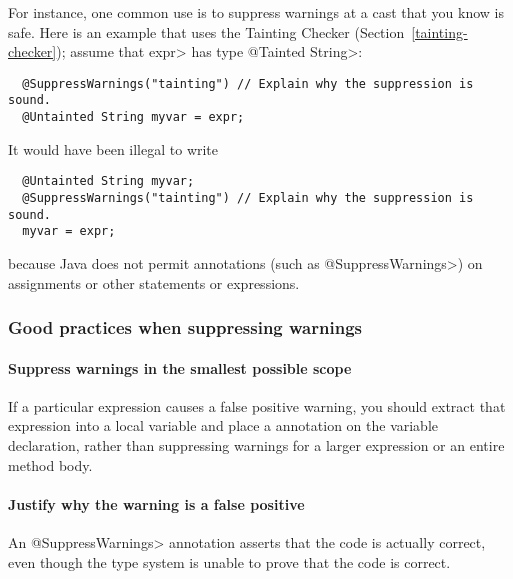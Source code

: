 For instance, one common use is
to suppress warnings at a cast that you know is safe.  Here is an example
that uses the Tainting Checker (Section~\ref{tainting-checker}); assume
that \<expr> has type \<@Tainted String>:

\begin{Verbatim}
  @SuppressWarnings("tainting") // Explain why the suppression is sound.
  @Untainted String myvar = expr;
\end{Verbatim}

\noindent
It would have been illegal to write

\begin{Verbatim}
  @Untainted String myvar;
  @SuppressWarnings("tainting") // Explain why the suppression is sound.
  myvar = expr;
\end{Verbatim}

\noindent
because Java does not permit annotations (such as \<@SuppressWarnings>) on
assignments or other statements or expressions.


\subsubsection{Good practices when suppressing warnings}

\paragraph{Suppress warnings in the smallest possible scope}

If a particular expression causes a
false positive warning, you should extract that expression into a local variable
and place a  annotation on the variable
declaration, rather than suppressing warnings for a larger expression or an
entire method body.


\paragraph{Justify why the warning is a false positive}

An \<@SuppressWarnings> annotation asserts that the code is actually
correct, even though the type system is unable to prove that the code is
correct.

